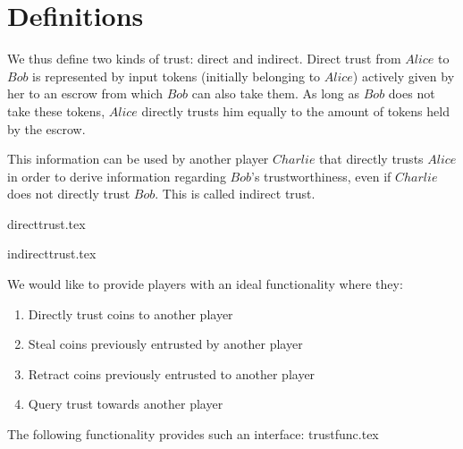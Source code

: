 \section{Definitions}
  We thus define two kinds of trust: direct and indirect. Direct trust from $Alice$ to $Bob$ is represented by input tokens
  (initially belonging to $Alice$) actively given by her to an escrow from which $Bob$ can also take them. As long as $Bob$
  does not take these tokens, $Alice$ directly trusts him equally to the amount of tokens held by the escrow.
  
  This information can be used by another player $Charlie$ that directly trusts $Alice$ in order to derive information
  regarding $Bob$'s trustworthiness, even if $Charlie$ does not directly trust $Bob$. This is called indirect trust.

  {directtrust.tex}

  {indirecttrust.tex}

  We would like to provide players with an ideal functionality where they:
  \begin{enumerate}
    \item Directly trust coins to another player
    \item Steal coins previously entrusted by another player
    \item Retract coins previously entrusted to another player
    \item Query trust towards another player
  \end{enumerate}
  The following functionality provides such an interface:
  {trustfunc.tex}

